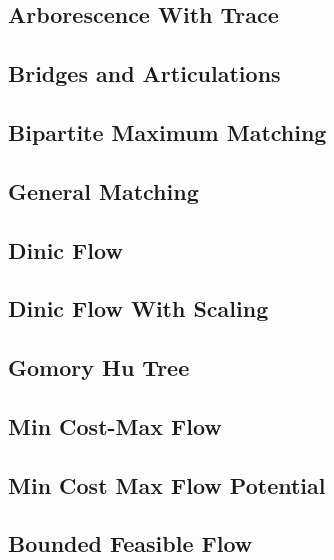 \subsection{Arborescence With Trace}
\raggedbottom
\hrulefill
\subsection{Bridges and Articulations}
\raggedbottom
\hrulefill
\subsection{Bipartite Maximum Matching}
\raggedbottom
\hrulefill
\subsection{General Matching}
\raggedbottom
\hrulefill
\subsection{Dinic Flow}
\raggedbottom
\hrulefill
\subsection{Dinic Flow With Scaling}
\raggedbottom
\hrulefill
\subsection{Gomory Hu Tree}
\raggedbottom
\hrulefill
\subsection{Min Cost-Max Flow}
\raggedbottom
\hrulefill
\subsection{Min Cost Max Flow Potential}
\raggedbottom
\hrulefill
\subsection{Bounded Feasible Flow}
\raggedbottom
\hrulefill
